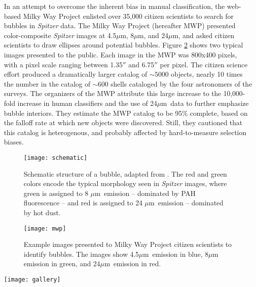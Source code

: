 \documentclass[preprint]{aastex}
\newcommand{\um}[0]{$\mu$m}
\newcommand{\hii}[0]{{\sc H\,ii}}
\begin{document}
In an attempt to overcome the inherent bias in manual classification, the web-based Milky Way Project \citep{Simpson12} enlisted over 35,000 citizen scientists to search for bubbles in \emph{Spitzer} data. The Milky Way Project (hereafter MWP) presented color-composite \emph{Spitzer} images at 4.5\um,  8\um, and 24\um, and asked citizen scientists to draw ellipses around potential bubbles. Figure \ref{fig:mwp} shows two typical images presented to the public. Each image in the MWP was 800x400 pixels, with a pixel scale ranging between 1.35$''$ and 6.75$''$ per pixel. The citizen science effort produced a dramatically larger catalog of $\sim 5000$ objects, nearly 10 times the number in the catalog of $\sim 600$ shells cataloged by the four astronomers of the \cite{Churchwell06, Churchwell07} surveys. The organizers of the MWP attribute this large increase to the 10,000-fold increase in human classifiers and the use of 24\um\, data to further emphasize bubble interiors. They estimate the MWP catalog to be 95\% complete, based on the falloff rate at which new objects were discovered. Still, they cautioned that this catalog is heterogenous, and probably affected by hard-to-measure selection biases. 

\begin{figure}[h!]
\texttt{[image: schematic]}
\caption{Schematic structure of a bubble, adapted from \citep{Freyer03}. The red and green colors encode the typical morphology seen in \emph{Spitzer} images, where green is assigned to 8 \um\, emission -- dominated by PAH fluorescence -- and red is assigned to 24 \um\, emission -- dominated by hot dust.}
\label{fig:schematic}
\end{figure}

\begin{figure}[h!]
\texttt{[image: mwp]}
\caption{Example images presented to Milky Way Project citizen scientists to identify bubbles. The images show 4.5\um\, emission in blue,  8\um\, emission in green, and 24\um\, emission in red.}
\label{fig:mwp}
\end{figure}

\begin{figure*}
\texttt{[image: gallery]}
\caption{Different astrophysical objects in the MWP catalog. a) ``Canonical'' wind-blown bubbles and \hii\, regions. b) shells
without 8 \um\, PAH emission (likely supernovae or bubbles around evolved massive stars). c) generic ISM structures of unclear astrophysical origin.}
\label{fig:gallery}
\end{figure*}
\end{document}
